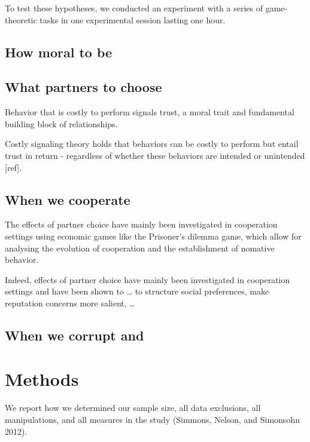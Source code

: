 \documentclass[man]{apa6}
\begin{document}
To test these hypotheses, we conducted an experiment with a series of
game-theoretic tasks in one experimental session lasting one hour.

\hypertarget{how-moral-to-be}{%
\subsection{How moral to be}\label{how-moral-to-be}}

\hypertarget{what-partners-to-choose}{%
\subsection{What partners to choose}\label{what-partners-to-choose}}

Behavior that is costly to perform signals trust, a moral trait and
fundamental building block of relationships.

Costly signaling theory holds that behaviors can be costly to perform
but entail trust in return - regardless of whether these behaviors are
intended or unintended {[}ref{]}.

\hypertarget{when-we-cooperate}{%
\subsection{When we cooperate}\label{when-we-cooperate}}

The effects of partner choice have mainly been investigated in
cooperation settings using economic games like the Prisoner's dilemma
game, which allow for analysing the evolution of cooperation and the
establishment of nomative behavior.

Indeed, effects of partner choice have mainly been investigated in
cooperation settings and have been shown to \ldots{} to structure social
preferences, make reputation concerns more salient, \ldots{}

\hypertarget{when-we-corrupt-and}{%
\subsection{When we corrupt and}\label{when-we-corrupt-and}}

\hypertarget{methods}{%
\section{Methods}\label{methods}}

We report how we determined our sample size, all data exclusions, all
manipulations, and all measures in the study (Simmons, Nelson, and
Simonsohn 2012).
\end{document}
